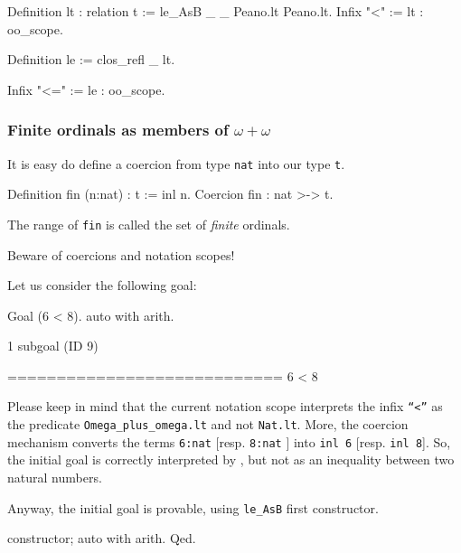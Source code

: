 \begin{Coqsrc}
Definition lt : relation t := le_AsB _ _ Peano.lt Peano.lt.
Infix "<" := lt : oo_scope.

Definition le := clos_refl _ lt.

Infix "<=" := le : oo_scope.
\end{Coqsrc}




\subsubsection{Finite ordinals as members of \texorpdfstring{$\omega+\omega$}{omega+omega}}

It is easy do define a coercion from type \texttt{nat} into our type \texttt{t}.

\begin{Coqsrc}
Definition fin (n:nat) : t := inl n.
Coercion fin : nat >-> t.
\end{Coqsrc}

The range of \texttt{fin} is called the set of \emph{finite} ordinals.


\begin{remark}
Beware of coercions and notation scopes!

Let us consider the following goal:

\begin{Coqsrc}
 Goal (6 < 8).
 auto with arith.
\end{Coqsrc}


\begin{Coqanswer}
1 subgoal (ID 9)
  
  ============================
  6 < 8
\end{Coqanswer}

Please keep in mind that the current notation scope interprets the infix \texttt{``<''} as the predicate \texttt{Omega\_plus\_omega.lt} and not \texttt{Nat.lt}. More,  the coercion mechanism converts the terms \texttt{6:nat} [resp. \texttt{8:nat} ]
into \texttt{inl 6} [resp. \texttt{inl 8}].  So, the initial goal is correctly interpreted by \coq{}, but not as an inequality between two natural numbers.

Anyway, the initial goal is provable, using \texttt{le\_AsB} first constructor.

\begin{Coqsrc}
  constructor; auto with arith.
Qed.
\end{Coqsrc}

\end{remark}

